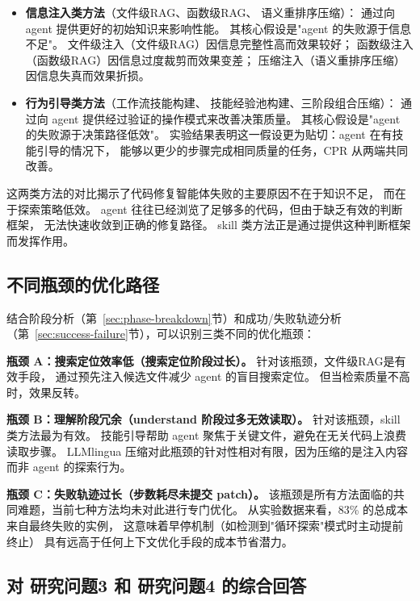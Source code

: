 \begin{itemize}
  \item \textbf{信息注入类方法}（文件级RAG、函数级RAG、
        语义重排序压缩）：
        通过向 agent 提供更好的初始知识来影响性能。
        其核心假设是"agent 的失败源于信息不足"。
        文件级注入（文件级RAG）因信息完整性高而效果较好；
        函数级注入（函数级RAG）因信息过度裁剪而效果变差；
        压缩注入（语义重排序压缩）因信息失真而效果折损。

  \item \textbf{行为引导类方法}（工作流技能构建、
        技能经验池构建、三阶段组合压缩）：
        通过向 agent 提供经过验证的操作模式来改善决策质量。
        其核心假设是"agent 的失败源于决策路径低效"。
        实验结果表明这一假设更为贴切：agent 在有技能引导的情况下，
        能够以更少的步骤完成相同质量的任务，CPR 从两端共同改善。
\end{itemize}

这两类方法的对比揭示了代码修复智能体失败的主要原因不在于知识不足，
而在于探索策略低效。
agent 往往已经浏览了足够多的代码，但由于缺乏有效的判断框架，
无法快速收敛到正确的修复路径。
skill 类方法正是通过提供这种判断框架而发挥作用。

\subsection{不同瓶颈的优化路径}
\label{subsec:bottleneck-analysis}

结合阶段分析（第~\ref{sec:phase-breakdown}节）和成功/失败轨迹分析
（第~\ref{sec:success-failure}节），可以识别三类不同的优化瓶颈：

\textbf{瓶颈 A：搜索定位效率低（搜索定位阶段过长）。}
针对该瓶颈，文件级RAG是有效手段，
通过预先注入候选文件减少 agent 的盲目搜索定位。
但当检索质量不高时，效果反转。

\textbf{瓶颈 B：理解阶段冗余（understand 阶段过多无效读取）。}
针对该瓶颈，skill 类方法最为有效。
技能引导帮助 agent 聚焦于关键文件，避免在无关代码上浪费读取步骤。
LLMlingua 压缩对此瓶颈的针对性相对有限，因为压缩的是注入内容而非 agent 的探索行为。

\textbf{瓶颈 C：失败轨迹过长（步数耗尽未提交 patch）。}
该瓶颈是所有方法面临的共同难题，当前七种方法均未对此进行专门优化。
从实验数据来看，83\% 的总成本来自最终失败的实例，
这意味着早停机制（如检测到"循环探索"模式时主动提前终止）
具有远高于任何上下文优化手段的成本节省潜力。

\subsection{对 研究问题3 和 研究问题4 的综合回答}
\label{subsec:研究问题-answer}

